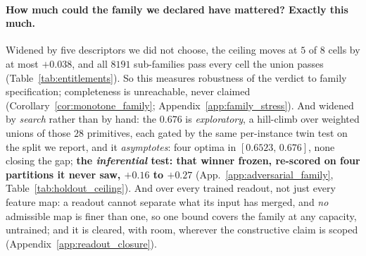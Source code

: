 \paragraph{How much could the family we declared have mattered? Exactly this much.} Widened by five descriptors we did not choose, the ceiling moves at $5$ of $8$ cells by at most $+0.038$, and all $8191$ sub-families pass every cell the union passes (Table~\ref{tab:entitlements}). So this measures robustness of the verdict to family specification; completeness is unreachable, never claimed (Corollary~\ref{cor:monotone_family}; Appendix~\ref{app:family_stress}). And widened by \emph{search} rather than by hand: the $0.676$ is \emph{exploratory}, a hill-climb over weighted unions of those $28$ primitives, each gated by the same per-instance twin test on the split we report, and it \emph{asymptotes}: four optima in $[0.6523,\,0.676]$, none closing the gap; \textbf{the \emph{inferential} test: that winner frozen, re-scored on four partitions it never saw, $+0.16$ to $+0.27$} (App.~\ref{app:adversarial_family}, Table~\ref{tab:holdout_ceiling}).
And over every trained readout, not just every feature map: a readout cannot separate what its input has merged, and \emph{no} admissible map is finer than one, so one bound covers the family at any capacity, untrained; and it is cleared, with room, wherever the constructive claim is scoped (Appendix~\ref{app:readout_closure}).

